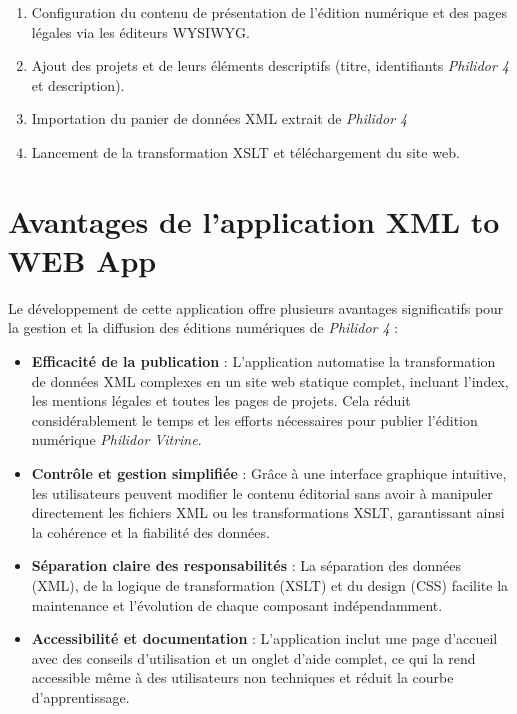 \begin{enumerate}
    \item Configuration du contenu de présentation de l'édition numérique et des pages légales via les éditeurs WYSIWYG.
    \item Ajout des projets et de leurs éléments descriptifs (titre, identifiants \textit{Philidor 4} et description).
    \item Importation du panier de données XML extrait de \textit{Philidor 4}
    \item Lancement de la transformation XSLT et téléchargement du site web.
\end{enumerate}

\section*{Avantages de l'application XML to WEB App}

Le développement de cette application offre plusieurs avantages significatifs pour la gestion et la diffusion des éditions numériques de \textit{Philidor 4} :

\begin{itemize}
    \item \textbf{Efficacité de la publication} :  
    L'application automatise la transformation de données XML complexes en un site web statique complet, incluant l'index, les mentions légales et toutes les pages de projets.  
    Cela réduit considérablement le temps et les efforts nécessaires pour publier l'édition numérique \textit{Philidor Vitrine}.

    \item \textbf{Contrôle et gestion simplifiée} :  
    Grâce à une interface graphique intuitive, les utilisateurs peuvent modifier le contenu éditorial sans avoir à manipuler directement les fichiers XML ou les transformations XSLT, garantissant ainsi la cohérence et la fiabilité des données.

    \item \textbf{Séparation claire des responsabilités} :  
    La séparation des données (XML), de la logique de transformation (XSLT) et du design (CSS) facilite la maintenance et l'évolution de chaque composant indépendamment.

    \item \textbf{Accessibilité et documentation} :  
    L'application inclut une page d'accueil avec des conseils d'utilisation et un onglet d'aide complet, ce qui la rend accessible même à des utilisateurs non techniques et réduit la courbe d'apprentissage.
\end{itemize}

